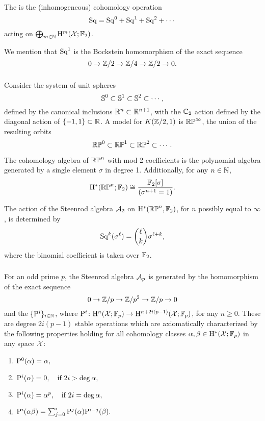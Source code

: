 The  is the (inhomogeneous) cohomology operation
\[
\mathrm{Sq} = \mathrm{Sq}^0 + \mathrm{Sq}^1 + \mathrm{Sq}^2 + \dotsb
\]
acting on \(\bigoplus_{m \in \mathbb{N}} \mathrm{H}^m(\mathcal{X}; {\mathbb{F}_2})\).

We mention that $\mathrm{Sq}^1$ is the Bockstein homomorphism of the exact sequence
\[
0 \to \mathbb{Z}/2 \to \mathbb{Z}/4 \to \mathbb{Z}/2 \to 0.
\]

\subsubsection{}\label{sss:cohomology_rpn}

Consider the system of unit spheres
\[
\mathbb{S}^0 \subset \mathbb{S}^1 \subset \mathbb{S}^2 \subset \dotsb,
\]
defined by the canonical inclusions \(\mathbb{R}^n \subset \mathbb{R}^{n+1}\), with the \(\mathbb{C}_2\) action defined by the diagonal action of \(\{-1,1\} \subset \mathbb{R}\).
A model for \(K(\mathbb{Z}/2, 1)\) is \(\mathbb{RP}^\infty\), the union of the resulting orbits
\[
\mathbb{RP}^0 \subset \mathbb{RP}^1 \subset \mathbb{RP}^2 \subset \dotsb.
\]

The cohomology algebra of $\mathbb{RP}^n$ with mod 2 coefficients is the polynomial algebra generated by a single element $\sigma$ in degree 1.
Additionally, for any $n \in \mathbb{N}$,
\[
\mathrm{H}^\ast(\mathbb{RP}^n; {\mathbb{F}_2}) \cong \frac{{\mathbb{F}_2}[\sigma]}{(\sigma^{n+1} = 1)}.
\]

The action of the Steenrod algebra $\mathcal{A}_2$ on $\mathrm{H}^*(\mathbb{RP}^n, {\mathbb{F}_2})$, for $n$ possibly equal to $\infty$, is determined by
\[
\mathrm{Sq}^k(\sigma^\ell) = \binom{\ell}{k}\sigma^{\ell+k},
\]
where the binomial coefficient is taken over \({\mathbb{F}_2}\).

\subsubsection{}\label{sss:steenrod_odd}

For an odd prime \(p\), the Steenrod algebra $\mathcal{A}_p$ is generated by the  homomorphism of the exact sequence
\[
0 \to \mathbb{Z}/p \to \mathbb{Z}/p^2 \to \mathbb{Z}/p \to 0
\]
and the  \(\{\mathrm{P}^i\}_{i \in \mathbb{N}}\), where $\mathrm{P}^i \colon \mathrm{H}^n(\mathcal{X}; {\mathbb{F}_p}) \to \mathrm{H}^{n+2i(p-1)}(\mathcal{X}; {\mathbb{F}_p})$, for any $n\geq 0$.
These are degree \(2i(p-1)\) stable operations which are axiomatically characterized by the following properties holding for all cohomology classes \(\alpha, \beta \in \mathrm{H}^*(\mathcal{X}; {\mathbb{F}_p})\) in any space \(\mathcal{X}\):

\begin{enumerate}
	\item \(\mathrm{P}^0(\alpha) = \alpha,\)
	\item \(\mathrm{P}^i(\alpha) = 0, \quad \text{if } 2i > \deg\alpha,\)
	\item \(\mathrm{P}^i(\alpha) = \alpha^p, \quad \text{if } 2i = \deg\alpha,\)
	\item \(\mathrm{P}^i(\alpha \beta) = \textstyle\sum_{j=0}^{i} \mathrm{P}^j(\alpha) \mathrm{P}^{i-j}(\beta).\)
\end{enumerate}

